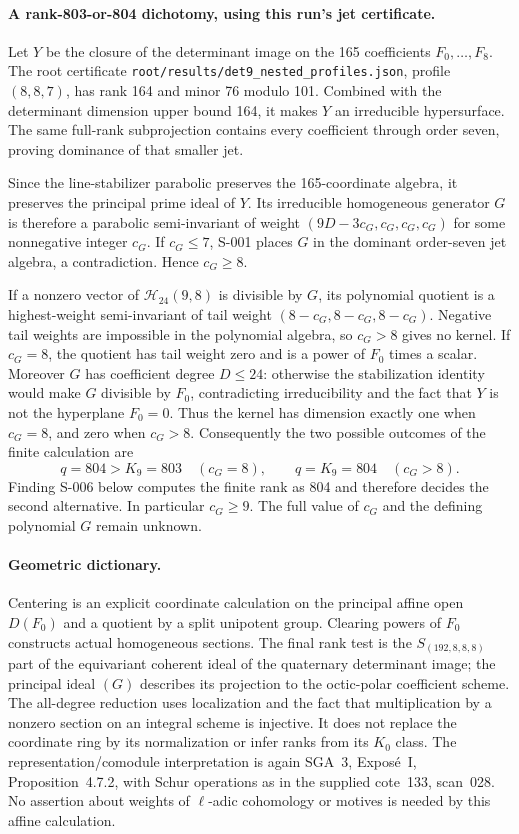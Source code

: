 \paragraph{A rank-803-or-804 dichotomy, using this run's jet certificate.}
Let $Y$ be the closure of the determinant image on the 165 coefficients
$F_0,\ldots,F_8$. The root certificate
\texttt{root/results/det9\_nested\_profiles.json}, profile $(8,8,7)$,
has rank 164 and minor 76 modulo 101. Combined with the determinant
dimension upper bound 164, it makes $Y$ an irreducible hypersurface.
The same full-rank subprojection contains every coefficient through
order seven, proving dominance of that smaller jet.

Since the line-stabilizer parabolic preserves the 165-coordinate
algebra, it preserves the principal prime ideal of $Y$. Its irreducible
homogeneous generator $G$ is therefore a parabolic semi-invariant of
weight $(9D-3c_G,c_G,c_G,c_G)$ for some nonnegative integer $c_G$.
If $c_G\leq7$, S-001 places $G$ in the dominant order-seven jet algebra,
a contradiction. Hence $c_G\geq8$.

If a nonzero vector of $\mathcal H_{24}(9,8)$ is divisible by $G$, its
polynomial quotient is a highest-weight semi-invariant of tail weight
$(8-c_G,8-c_G,8-c_G)$. Negative tail weights are impossible in the
polynomial algebra, so $c_G>8$ gives no kernel. If $c_G=8$, the quotient
has tail weight zero and is a power of $F_0$ times a scalar. Moreover
$G$ has coefficient degree $D\leq24$: otherwise the stabilization
identity would make $G$ divisible by $F_0$, contradicting irreducibility
and the fact that $Y$ is not the hyperplane $F_0=0$. Thus the kernel
has dimension exactly one when $c_G=8$, and zero when $c_G>8$.
Consequently the two possible outcomes of the finite calculation are
\[
  q=804>K_9=803\quad(c_G=8),\qquad
  q=K_9=804\quad(c_G>8).
\]
Finding S-006 below computes the finite rank as 804 and therefore
decides the second alternative.  In particular $c_G\geq9$.  The full
value of $c_G$ and the defining polynomial $G$ remain unknown.

\paragraph{Geometric dictionary.}
Centering is an explicit coordinate calculation on the principal affine
open $D(F_0)$ and a quotient by a split unipotent group. Clearing powers
of $F_0$ constructs actual homogeneous sections. The final rank test is
the $S_{(192,8,8,8)}$ part of the equivariant coherent ideal of the
quaternary determinant image; the principal ideal $(G)$ describes its
projection to the octic-polar coefficient scheme. The all-degree
reduction uses localization and the fact that multiplication by a
nonzero section on an integral scheme is injective. It does not replace
the coordinate ring by its normalization or infer ranks from its
$K_0$ class. The representation/comodule interpretation is again SGA~3,
Expos\'e~I, Proposition~4.7.2, with Schur operations as in the supplied
cote~133, scan~028. No assertion about weights of $\ell$-adic cohomology
or motives is needed by this affine calculation.


